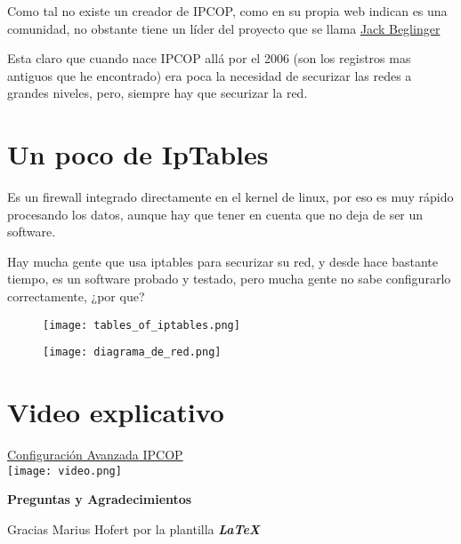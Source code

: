 \documentclass[
paper=128mm:96mm, %
fontsize=11pt, %
pagesize, %
parskip=half-, %
]{scrartcl} %
\begin{document}
Como tal no existe un creador de IPCOP, como en su propia web indican es una comunidad, no obstante tiene un líder del proyecto que se llama \href{https://www.linkedin.com/in/jackbeglinger}{Jack Beglinger}

Esta claro que cuando nace IPCOP allá por el 2006\cite{historia2} (son los registros mas antiguos que he encontrado) era poca la necesidad de securizar las redes a grandes niveles, pero, siempre hay que securizar la red.
\clearpage

\section{Un poco de IpTables \cite{iptables1}}
Es un firewall integrado directamente en el kernel de linux, por eso es muy rápido procesando los datos, aunque hay que tener en cuenta que no deja de ser un software.

Hay mucha gente que usa iptables\cite{iptables2} para securizar su red, y desde hace bastante tiempo, es un software probado y testado, pero mucha gente no sabe configurarlo correctamente, ¿por que?
\clearpage

\begin{figure}
	\texttt{[image: tables\_of\_iptables.png]}
\end{figure}
\clearpage

\begin{figure}
	\texttt{[image: diagrama\_de\_red.png]}
\end{figure}
\clearpage

\section{Video explicativo}
\href{https://www.youtube.com/watch?v=Ip_z73Mrv3A}{Configuración Avanzada IPCOP} \\
\texttt{[image: video.png]}
\clearpage




\clearpage


\thispagestyle{empty} %

\begin{flushright}
\vspace{0.6cm}
\color{white}\sffamily
{\bfseries\LARGE Preguntas y Agradecimientos\par} %
\vfill
\end{flushright}
Gracias Marius Hofert por la plantilla \Large{\textit{\textbf{LaTeX}}}

\thispagestyle{empty} %
\end{document}
